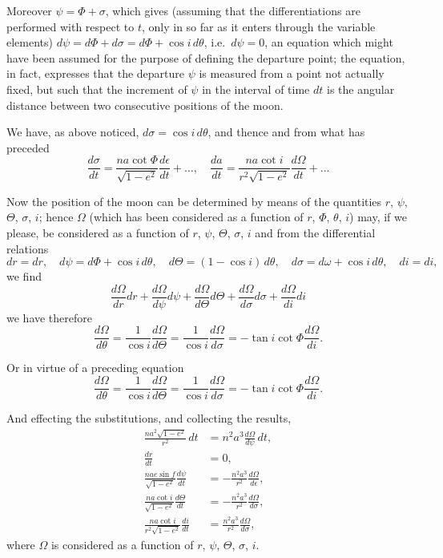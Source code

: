 \documentclass[11pt,a4paper]{book}
\begin{document}
Moreover $\psi = \Phi + \sigma$, which gives (assuming that the differentiations are performed with respect to $t$, only in so far as it enters through the variable elements) $d\psi = d\Phi + d\sigma = d\Phi + \cos i\, d\theta$, i.e.\ $d\psi = 0$, an equation which might have been assumed for the purpose of defining the departure point; the equation, in fact, expresses that the departure $\psi$ is measured from a point not actually fixed, but such that the increment of $\psi$ in the interval of time $dt$ is the angular distance between two consecutive positions of the moon.

We have, as above noticed, $d\sigma = \cos i\, d\theta$, and thence and from what has preceded
\[
\frac{d\sigma}{dt} = \frac{na\cot\Phi}{\sqrt{1-e^2}}\frac{d\epsilon}{dt} + \ldots, \quad \frac{da}{dt} = \frac{na\cot i}{r^2\sqrt{1-e^2}}\frac{d\Omega}{dt} + \ldots
\]

Now the position of the moon can be determined by means of the quantities $r$, $\psi$, $\Theta$, $\sigma$, $i$; hence $\Omega$ (which has been considered as a function of $r$, $\Phi$, $\theta$, $i$) may, if we please, be considered as a function of $r$, $\psi$, $\Theta$, $\sigma$, $i$ and from the differential relations
\[
dr = dr, \quad d\psi = d\Phi + \cos i\, d\theta, \quad d\Theta = (1-\cos i)\, d\theta, \quad d\sigma = d\omega + \cos i\, d\theta, \quad di = di,
\]
we find
\[
\frac{d\Omega}{dr}dr + \frac{d\Omega}{d\psi}d\psi + \frac{d\Omega}{d\Theta}d\Theta + \frac{d\Omega}{d\sigma}d\sigma + \frac{d\Omega}{di}di
\]
we have therefore
\[
\frac{d\Omega}{d\theta} = \frac{1}{\cos i}\frac{d\Omega}{d\Theta} = \frac{1}{\cos i}\frac{d\Omega}{d\sigma} = -\tan i\cot\Phi\frac{d\Omega}{di}.
\]

Or in virtue of a preceding equation
\[
\frac{d\Omega}{d\theta} = \frac{1}{\cos i}\frac{d\Omega}{d\Theta} = \frac{1}{\cos i}\frac{d\Omega}{d\sigma} = -\tan i\cot\Phi\frac{d\Omega}{di}.
\]

And effecting the substitutions, and collecting the results,
\begin{align*}
\frac{na^2\sqrt{1-e^2}}{r^2}\, dt &= n^2a^3\frac{d\Omega}{d\psi}\, dt, \\
\frac{dr}{dt} &= 0, \\
\frac{nae\sin f}{\sqrt{1-e^2}}\frac{d\psi}{dt} &= -\frac{n^2a^3}{r^2}\frac{d\Omega}{d\epsilon}, \\
\frac{na\cot i}{\sqrt{1-e^2}}\frac{d\Theta}{dt} &= -\frac{n^2a^3}{r^2}\frac{d\Omega}{d\sigma}, \\
\frac{na\cot i}{r^2\sqrt{1-e^2}}\frac{di}{dt} &= \frac{n^2a^3}{r^2}\frac{d\Omega}{d\sigma},
\end{align*}
where $\Omega$ is considered as a function of $r$, $\psi$, $\Theta$, $\sigma$, $i$.
\end{document}

